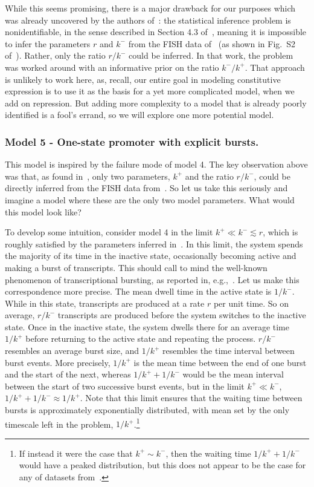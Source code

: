 While this seems promising, there is a major drawback for our purposes which was
already uncovered by the authors of~\cite{Razo-Mejia2020}: the statistical
inference problem is nonidentifiable, in the sense described in Section 4.3
of~\cite{Gelman2013}, meaning it is impossible to infer the parameters $r$ and
$k^-$ from the FISH data of~\cite{Jones2014} (as shown in Fig.~S2
of~\cite{Razo-Mejia2020}). Rather, only the ratio $r/k^-$ could be inferred. In
that work, the problem was worked around with an informative prior on the ratio
$k^-/k^+$. That approach is unlikely to work here, as, recall, our entire goal
in modeling constitutive expression is to use it as the basis for a yet more
complicated model, when we add on repression. But adding more complexity to a
model that is already poorly identified is a fool's errand, so we will explore
one more potential model.

\subsubsection{Model 5 - One-state promoter with explicit bursts.}
This model is inspired by the failure mode of model 4. The key observation above
was that, as found in~\cite{Razo-Mejia2020}, only two parameters, $k^+$ and the
ratio $r/k^-$, could be directly inferred from the FISH data
from~\cite{Jones2014}. So let us take this seriously and imagine a model where
these are the only two model parameters. What would this model look like?

To develop some intuition, consider model 4 in the limit $k^+ \ll k^- \lesssim
r$, which is roughly satisfied by the parameters inferred
in~\cite{Razo-Mejia2020}. In this limit, the system spends the majority of its
time in the inactive state, occasionally becoming active and making a burst of
transcripts. This should call to mind the well-known phenomenon of
transcriptional bursting, as reported in,
e.g.,~\cite{Golding2005,Chong2014,Sevier2016}. Let us make this correspondence more precise. The mean dwell
time in the active state is $1/k^-$. While in this state, transcripts are
produced at a rate $r$ per unit time. So on average, $r/k^-$ transcripts are
produced before the system switches to the inactive state. Once in the inactive
state, the system dwells there for an average time $1/k^+$ before returning to
the active state and repeating the process. $r/k^-$ resembles an average burst
size, and $1/k^+$ resembles the time interval between burst events. More
precisely, $1/k^+$ is the mean time between the end of one burst and the start
of the next, whereas $1/k^+ + 1/k^-$ would be the mean interval between the
start of two successive burst events, but in the limit $k^+ \ll k^-$, $1/k^+ +
1/k^- \approx 1/k^+$. Note that this limit ensures that the waiting time between
bursts is approximately exponentially distributed, with mean set by the only
timescale left in the problem, $1/k^+$.\footnote{If instead it were the case
that $k^+ \sim k^-$, then the waiting time $1/k^+ + 1/k^-$ would have a peaked
distribution, but this does not appear to be the case for any of datasets
from~\cite{Jones2014}.}

